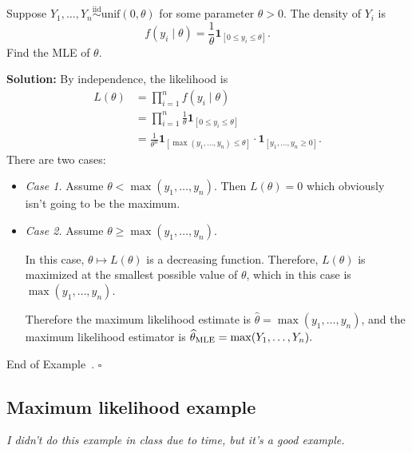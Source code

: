 \documentclass[10pt]{article}
\theoremstyle{definition}
\newtheorem{example}[theorem]{Example}
\renewenvironment{example}
{\begin{oldexample}}
  {\par\smallskip\hfill   End of Example~\theexample. $\square$    \par\end{oldexample}}
\newcommand{\vt}{\vskip 5mm} %
\newcommand{\Fl}{\vt\noindent\textbf} %
\newcommand{\1}[1]{\textbf{1}_{\left[#1\right]}} %
\begin{document}
\begin{example}[Example 9.15 in textbook]
  Suppose $Y_{1},\ldots,Y_{n}\overset{\text{iid}}{\sim} \text{unif}(0,\theta)$
  for some parameter $\theta>0$. The density of $Y_{i}$ is
  \begin{equation*}
    f(y_{i}\mid \theta) = \frac{1}{\theta} \mathbf{1}_{\left[ 0 \leq y_{i}\leq \theta\right]}.
  \end{equation*}
  Find the MLE of $\theta$.

  \Fl{Solution:} By independence, the likelihood is
  \begin{align*}
    L(\theta) 
    &= \prod_{i=1}^{n} f(y_{i}\mid \theta)\\
    &= \prod_{i=1}^{n} \frac{1}{\theta} \mathbf{1}_{\left[ 0 \leq y_{i}\leq \theta\right]}\\
    &= \frac{1}{\theta^{n}} \mathbf{1}_{\left[ \max(y_{1},\ldots,y_{n}) \leq \theta\right]}\cdot \mathbf{1}_{\left[ y_{1},\ldots, y_{n}\geq 0\right] }.
  \end{align*}
  There are two cases:
  \begin{itemize}
    \item \textit{Case 1.} Assume $\theta<\max(y_{1},\ldots,y_{n})$. Then
    $L(\theta)=0$ which obviously isn't going to be the maximum.
    \item \textit{Case 2.} Assume $\theta \geq \max(y_{1},\ldots,y_{n})$.

    In this case, $\theta\mapsto L(\theta)$ is a decreasing function.
    Therefore, $L(\theta)$ is maximized at the smallest possible value of
    $\theta$, which in this case is $\max(y_{1},\ldots,y_{n})$.

    Therefore the maximum likelihood estimate is
    $\widehat{\theta}=\max(y_{1},\ldots,y_{n})$, and the maximum likelihood
    estimator is $\widehat{\theta}_{\rm MLE} = \max(Y_{1},\ldots,Y_{n}). $
  \end{itemize}   
\end{example}

\subsection{Maximum likelihood example}
\textit{I didn't do this example in class due to time, but it's a good
  example.}
\end{document}
